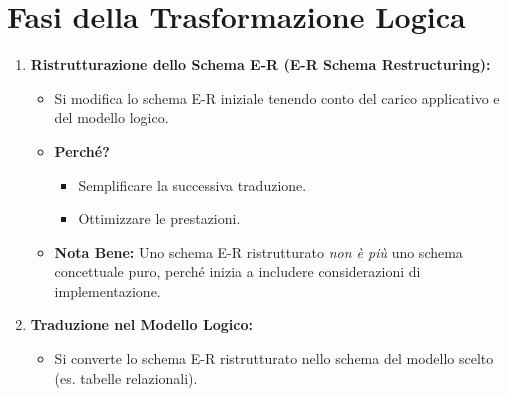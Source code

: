 \section{Fasi della Trasformazione Logica}
\begin{enumerate}
	\item \textbf{Ristrutturazione dello Schema E-R (E-R Schema Restructuring):}
	\begin{itemize}
		\item Si modifica lo schema E-R iniziale tenendo conto del carico applicativo e del modello logico.
		\item \textbf{Perché?}
		\begin{itemize}
			\item Semplificare la successiva traduzione.
			\item Ottimizzare le prestazioni.
		\end{itemize}
		\item \textbf{Nota Bene:} Uno schema E-R ristrutturato \textit{non è più} uno schema concettuale puro, perché inizia a includere considerazioni di implementazione.
	\end{itemize}
	\item \textbf{Traduzione nel Modello Logico:}
	\begin{itemize}
		\item Si converte lo schema E-R ristrutturato nello schema del modello scelto (es. tabelle relazionali).
	\end{itemize}
\end{enumerate}

